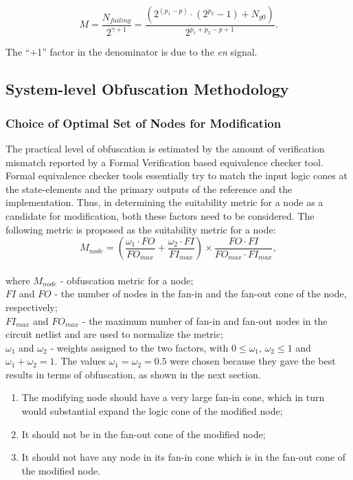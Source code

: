 \documentclass{optica-article}
\begin{document}
\begin{equation}
    \label{equation:3}
    M=\frac{N_{failing}}{2^{\gamma+1}} =\frac{(2^{(p_1- p)}\cdot(2^{p_2} - 1)+N_{g0})}{2^{p_1+p_2-p+1}}.
\end{equation}

\indent The “+1” factor in the denominator is due to the \textit{en} signal.\\



\subsection{System-level Obfuscation Methodology}

\subsubsection{Choice of Optimal Set of Nodes for Modification}

The practical level of obfuscation is estimated by the amount of verification mismatch reported by a Formal Verification based equivalence checker tool. Formal equivalence checker tools essentially try to match the input logic cones at the state-elements and the primary outputs of the reference and the implementation. Thus, in determining the suitability metric for a node as a candidate for modification, both these factors need to be considered. The following metric is proposed as the suitability metric for a node:$$M_{node}=\left(\frac{\omega_1\cdot FO}{FO_{max}}+\frac{\omega_2\cdot FI}{FI_{max}}\right)\times\frac{FO\cdot FI}{FO_{max}\cdot FI_{max}},$$\\
where $M_{node}$ - obfuscation metric for a node;\\
$FI$ and $FO$ - the number of nodes in the fan-in and the fan-out cone of the node, respectively;\\
$FI_{max}$ and $FO_{max}$ - the maximum number of fan-in and fan-out nodes in the circuit netlist and are used to normalize the metric;\\
$\omega_1$ and $\omega_2$ - weights assigned to the two factors, with $0\leq\omega_1$, $\omega_2\leq1$ and $\omega_1 + \omega_2 = 1$. The values $\omega_1 = \omega_2 = 0.5$ were chosen because they gave the best results in terms of obfuscation, as shown in the next section.

\begin{enumerate}
    \item The modifying node should have a very large fan-in cone, which in turn would substantial expand the logic cone of the modified node;
    \item It should not be in the fan-out cone of the modified node;
    \item It should not have any node in its fan-in cone which is in the fan-out cone of the modified node.
\end{enumerate}
\end{document}
